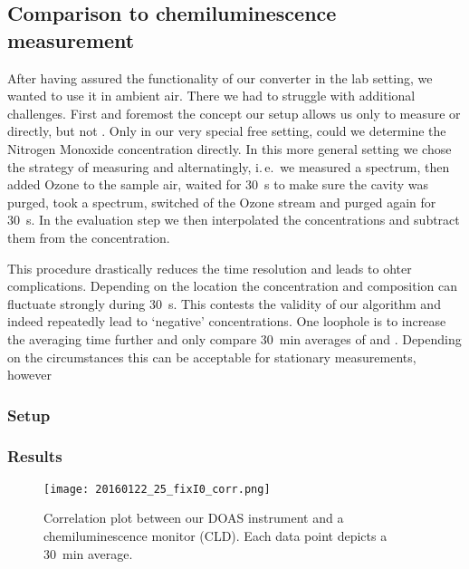 \subsection{Comparison to chemiluminescence measurement}
\label{sec:cld}

After having assured the functionality of our converter in the lab
setting, we wanted to use it in ambient air. There we had to struggle
with additional challenges. First and foremost the concept our setup
allows us only to measure  or  directly, but not
. Only in our very special  free setting, could we
determine the Nitrogen Monoxide concentration directly. In this more
general setting we chose the strategy of measuring  and
 alternatingly, i.\,e.\ we measured a  spectrum, then
added Ozone to the sample air, waited for \SI{30}{\second} to make
sure the cavity was purged, took a  spectrum, switched of the
Ozone stream and purged again for \SI{30}{\second}. In the evaluation
step we then interpolated the  concentrations and subtract
them from the  concentration. 

This procedure drastically reduces the time resolution and leads to
ohter complications. Depending on the location the 
concentration and composition can fluctuate strongly during
\SI{30}{\second}. This contests the validity of our algorithm and
indeed repeatedly lead to `negative'  concentrations. One
loophole is to increase the averaging time further and only compare
\SI{30}{\minute} averages of  and . Depending on the
circumstances this can be acceptable for stationary measurements, however


\subsubsection{Setup}
\label{sec:cld-setup}

\subsubsection{Results}
\label{sec:cld-results}

\begin{figure}[htbp]
  \centering
  \texttt{[image: 20160122\_25\_fixI0\_corr.png]}
  \caption{Correlation plot between our DOAS instrument and a
    chemiluminescence monitor (CLD). Each data point depicts a
    \SI{30}{\minute} average.}
  \label{fig:cld-corr}
\end{figure}


